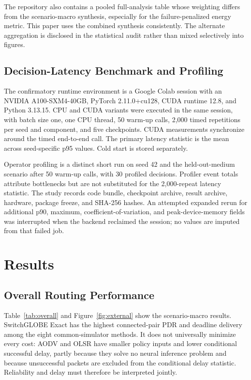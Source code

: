 \documentclass[drones,article,submit,moreauthors]{Definitions/mdpi}
\newcommand{\SG}{SwitchGLOBE}
\begin{document}
The repository also contains a pooled full-analysis table whose weighting differs from the scenario-macro synthesis, especially for the failure-penalized energy metric. This paper uses the combined synthesis consistently. The alternate aggregation is disclosed in the statistical audit rather than mixed selectively into figures.

\subsection{Decision-Latency Benchmark and Profiling}

The confirmatory runtime environment is a Google Colab session with an NVIDIA A100-SXM4-40GB, PyTorch 2.11.0+cu128, CUDA runtime 12.8, and Python 3.13.15. CPU and CUDA variants were executed in the same session, with batch size one, one CPU thread, 50 warm-up calls, 2,000 timed repetitions per seed and component, and five checkpoints. CUDA measurements synchronize around the timed end-to-end call. The primary latency statistic is the mean across seed-specific p95 values. Cold start is stored separately.

Operator profiling is a distinct short run on seed 42 and the held-out-medium scenario after 50 warm-up calls, with 30 profiled decisions. Profiler event totals attribute bottlenecks but are not substituted for the 2,000-repeat latency statistic. The study records code bundle, checkpoint archive, result archive, hardware, package freeze, and SHA-256 hashes. An attempted expanded rerun for additional p90, maximum, coefficient-of-variation, and peak-device-memory fields was interrupted when the backend reclaimed the session; no values are imputed from that failed job.

\section{Results}

\subsection{Overall Routing Performance}

Table~\ref{tab:overall} and Figure~\ref{fig:external} show the scenario-macro results. \SG{} Exact has the highest connected-pair PDR and deadline delivery among the eight common-simulator methods. It does not universally minimize every cost: AODV and OLSR have smaller policy inputs and lower conditional successful delay, partly because they solve no neural inference problem and because unsuccessful packets are excluded from the conditional delay statistic. Reliability and delay must therefore be interpreted jointly.
\end{document}
